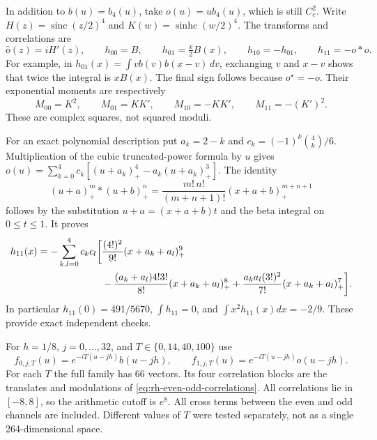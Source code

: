 In addition to $b(u)=b_4(u)$, take $o(u)=u b_4(u)$, which is still
$C_c^2$. Write $H(z)=\operatorname{sinc}(z/2)^4$ and
$K(w)=\operatorname{sinhc}(w/2)^4$. The transforms and correlations are
\begin{equation}
 \widehat o(z)=iH'(z),\qquad
 h_{00}=B,\qquad h_{01}=\tfrac{x}{2}B(x),\qquad
 h_{10}=-h_{01},\qquad h_{11}=-o*o.
 \label{eq:rh-even-odd-correlations}
\end{equation}
For example, in $h_{01}(x)=\int v b(v)b(x-v)\,dv$, exchanging $v$
and $x-v$ shows that twice the integral is $xB(x)$.
The final sign follows because $o^\star=-o$.
Their exponential moments are respectively
\begin{equation}
 M_{00}=K^2,\qquad M_{01}=KK',\qquad
 M_{10}=-KK',\qquad M_{11}=-(K')^2.
 \label{eq:rh-correlation-moments}
\end{equation}
These are complex squares, not squared moduli.

For an exact polynomial description put $a_k=2-k$ and
$c_k=(-1)^k\binom4k/6$. Multiplication of the cubic truncated-power
formula by $u$ gives
$o(u)=\sum_{k=0}^4c_k[(u+a_k)_+^4-a_k(u+a_k)_+^3]$.
The identity
\[
 (u+a)_+^m*(u+b)_+^n
 =\frac{m!\,n!}{(m+n+1)!}(x+a+b)_+^{m+n+1}
 \]
follows by the substitution $u+a=(x+a+b)t$ and the beta integral
on $0\le t\le1$. It proves
\begin{align}
 h_{11}(x)=-\sum_{k,l=0}^4c_kc_l\bigg[
 &\frac{(4!)^2}{9!}(x+a_k+a_l)_+^9\notag\\
 &-\frac{(a_k+a_l)4!3!}{8!}(x+a_k+a_l)_+^8
 +\frac{a_ka_l(3!)^2}{7!}(x+a_k+a_l)_+^7\bigg].
 \label{eq:rh-odd-correlation-polynomial}
\end{align}
In particular $h_{11}(0)=491/5670$, $\int h_{11}=0$, and
$\int x^2h_{11}(x)dx=-2/9$. These provide exact independent checks.

For $h=1/8$, $j=0,\ldots,32$, and $T\in\{0,14,40,100\}$ use
\[
 f_{0,j,T}(u)=e^{-iT(u-jh)}b(u-jh),\qquad
 f_{1,j,T}(u)=e^{-iT(u-jh)}o(u-jh).
 \]
For each $T$ the full family has 66 vectors. Its four correlation blocks
are the translates and modulations of \eqref{eq:rh-even-odd-correlations}.
All correlations lie in $[-8,8]$, so the arithmetic cutoff is $e^8$.
All cross terms between the even and odd channels are included.
Different values of $T$ were tested separately, not as a single
264-dimensional space.

